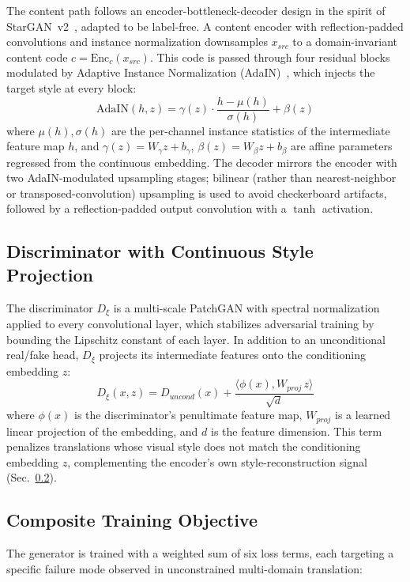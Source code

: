 \documentclass[conference]{IEEEtran}
\begin{document}
The content path follows an encoder-bottleneck-decoder design in the spirit of StarGAN~v2~\cite{choi2020starganv2}, adapted to be label-free. A content encoder with reflection-padded convolutions and instance normalization downsamples $x_{src}$ to a domain-invariant content code $c = \mathrm{Enc}_c(x_{src})$. This code is passed through four residual blocks modulated by Adaptive Instance Normalization (AdaIN)~\cite{huang2017adain}, which injects the target style at every block:
\begin{equation}
\mathrm{AdaIN}(h, z) = \gamma(z)\cdot\frac{h - \mu(h)}{\sigma(h)} + \beta(z)
\label{eq:adain}
\end{equation}
where $\mu(h), \sigma(h)$ are the per-channel instance statistics of the intermediate feature map $h$, and $\gamma(z) = W_\gamma z + b_\gamma$, $\beta(z) = W_\beta z + b_\beta$ are affine parameters regressed from the continuous embedding. The decoder mirrors the encoder with two AdaIN-modulated upsampling stages; bilinear (rather than nearest-neighbor or transposed-convolution) upsampling is used to avoid checkerboard artifacts, followed by a reflection-padded output convolution with a $\tanh$ activation.

\subsection{Discriminator with Continuous Style Projection}
The discriminator $D_\xi$ is a multi-scale PatchGAN with spectral normalization~\cite{miyato2018spectral} applied to every convolutional layer, which stabilizes adversarial training by bounding the Lipschitz constant of each layer. In addition to an unconditional real/fake head, $D_\xi$ projects its intermediate features onto the conditioning embedding $z$:
\begin{equation}
D_\xi(x, z) = D_{uncond}(x) + \frac{\langle \phi(x), W_{proj}\,z\rangle}{\sqrt{d}}
\label{eq:disc}
\end{equation}
where $\phi(x)$ is the discriminator's penultimate feature map, $W_{proj}$ is a learned linear projection of the embedding, and $d$ is the feature dimension. This term penalizes translations whose visual style does not match the conditioning embedding $z$, complementing the encoder's own style-reconstruction signal (Sec.~\ref{sec:objective}).

\subsection{Composite Training Objective}
\label{sec:objective}
The generator is trained with a weighted sum of six loss terms, each targeting a specific failure mode observed in unconstrained multi-domain translation:
\end{document}
